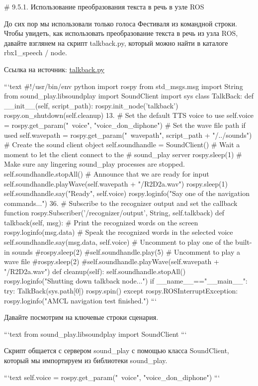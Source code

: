 # 9.5.1. Использование преобразования текста в речь в узле ROS


До сих пор мы использовали только голоса Фестиваля из командной строки. Чтобы увидеть, как использовать преобразование текста в речь из узла ROS, давайте взглянем на скрипт talkback.py, который можно найти в каталоге rbx1\_speech / node. 

Ссылка на источник: \href{https://github.com/pirobot/rbx1/blob/indigo-devel/rbx1_speech/nodes/talkback.py}{talkback.py}

```text
#!/usr/bin/env python 
import rospy
from std_msgs.msg import String
from sound_play.libsoundplay import SoundClient
import sys
class TalkBack:
def __init__(self, script_path):
rospy.init_node('talkback')
rospy.on_shutdown(self.cleanup) 13.
# Set the default TTS voice to use
self.voice = rospy.get_param("~voice", "voice_don_diphone")
# Set the wave file path if used
self.wavepath = rospy.get_param("~wavepath", script_path +
"/../sounds")
# Create the sound client object
self.soundhandle = SoundClient()
# Wait a moment to let the client connect to the
# sound_play server
rospy.sleep(1)
# Make sure any lingering sound_play processes are stopped.
self.soundhandle.stopAll()
# Announce that we are ready for input
self.soundhandle.playWave(self.wavepath + "/R2D2a.wav")
rospy.sleep(1)
self.soundhandle.say("Ready", self.voice)
rospy.loginfo("Say one of the navigation commands...") 36.
# Subscribe to the recognizer output and set the callback
function
rospy.Subscriber('/recognizer/output', String, self.talkback)
def talkback(self, msg):
# Print the recognized words on the screen
rospy.loginfo(msg.data)
# Speak the recognized words in the selected voice
self.soundhandle.say(msg.data, self.voice)
# Uncomment to play one of the built-in sounds #rospy.sleep(2)
#self.soundhandle.play(5)
# Uncomment to play a wave file
#rospy.sleep(2) #self.soundhandle.playWave(self.wavepath + "/R2D2a.wav")
def cleanup(self):
self.soundhandle.stopAll() rospy.loginfo("Shutting down talkback node...")
if __name__=="__main__": try:
TalkBack(sys.path[0])
rospy.spin()
except rospy.ROSInterruptException:
rospy.loginfo("AMCL navigation test finished.")
```

Давайте посмотрим на ключевые строки сценария.

```text
from sound_play.libsoundplay import SoundClient
```

Скрипт общается с сервером sound\_play с помощью класса SoundClient, который мы импортируем из библиотеки sound\_play.

```text
self.voice = rospy.get_param("~voice", "voice_don_diphone")
```

